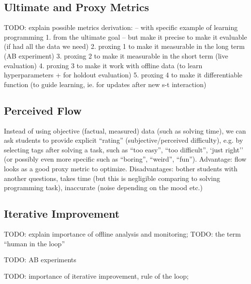 


\subsection{Ultimate and Proxy Metrics}

TODO: explain possible metrics derivation: -- with specific example of learning programming
1. from the ultimate goal -- but make it precise to make it evaluable (if had all the data we need)
2. proxing 1 to make it measurable in the long term (AB experiment)
3. proxing 2 to make it measurable in the short term (live evaluation)
4. proxing 3 to make it work with offline data (to learn hyperparameters + for holdout evaluation)
5. proxing 4 to make it differentiable function (to guide learning, ie. for updates after new s-t interaction)



\subsection{Perceived Flow}

Instead of using objective (factual, measured) data (such as solving time),
we can ask students to provide explicit ``rating'' (subjective/perceived difficulty),
  e.g. by selecting tags after solving a task,
  such as ``too easy'', ``too difficult'', `just right''
  (or possibly even more specific such as ``boring'', ``weird'', ``fun'').
Advantage: flow looks as a good proxy metric to optimize.
Disadvantages:
  bother students with another questions,
  takes time (but this is negligible comparing to solving programming task),
  inaccurate (noise depending on the mood etc.)



\subsection{Iterative Improvement}
\label{sec:iterative-improvement}


TODO: explain importance of offline analysis and monitoring;
TODO: the term ``human in the loop'' \cite{stupid-tutoring-systems-intelligent-humans}

TODO: AB experiments

TODO: importance of iterative improvement, rule of the loop;
